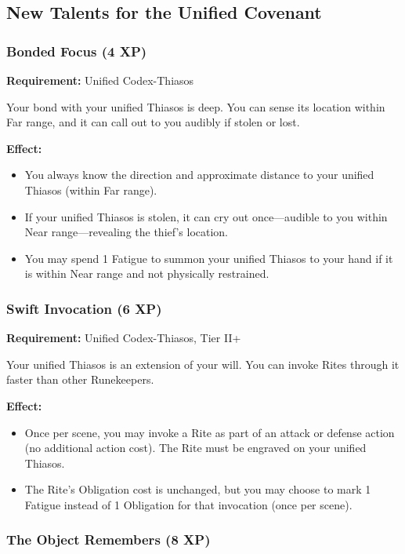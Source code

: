 \subsection{New Talents for the Unified Covenant}

\subsubsection{Bonded Focus (4 XP)}

\textbf{Requirement:} Unified Codex-Thiasos

Your bond with your unified Thiasos is deep. You can sense its location within Far range, and it can call out to you audibly if stolen or lost.

\textbf{Effect:}
\begin{itemize}
\item You always know the direction and approximate distance to your unified Thiasos (within Far range).
\item If your unified Thiasos is stolen, it can cry out once—audible to you within Near range—revealing the thief's location.
\item You may spend 1 Fatigue to summon your unified Thiasos to your hand if it is within Near range and not physically restrained.
\end{itemize}

\subsubsection{Swift Invocation (6 XP)}

\textbf{Requirement:} Unified Codex-Thiasos, Tier II+

Your unified Thiasos is an extension of your will. You can invoke Rites through it faster than other Runekeepers.

\textbf{Effect:}
\begin{itemize}
\item Once per scene, you may invoke a Rite as part of an attack or defense action (no additional action cost). The Rite must be engraved on your unified Thiasos.
\item The Rite's Obligation cost is unchanged, but you may choose to mark 1 Fatigue instead of 1 Obligation for that invocation (once per scene).
\end{itemize}

\subsubsection{The Object Remembers (8 XP)}

